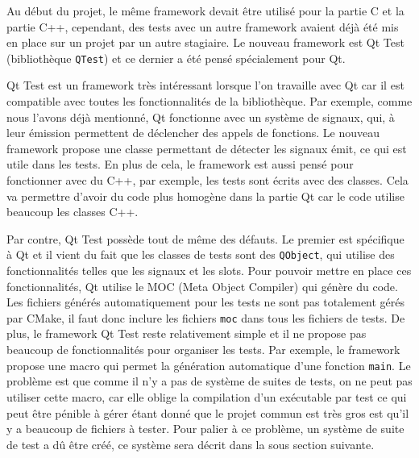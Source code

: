 \documentclass[a4paper]{article}
\begin{document}
Au début du projet, le même framework devait être utilisé pour la partie C et la
partie C++, cependant, des tests avec un autre framework avaient déjà été mis en
place sur un projet par un autre stagiaire. Le nouveau framework est Qt Test
(bibliothèque \verb|QTest|) et ce dernier a été pensé spécialement pour Qt.

Qt Test est un framework très intéressant lorsque l'on travaille avec Qt car il
est compatible avec toutes les fonctionnalités de la bibliothèque. Par exemple,
comme nous l'avons déjà mentionné, Qt fonctionne avec un système de signaux,
qui, à leur émission permettent de déclencher des appels de fonctions. Le
nouveau framework propose une classe permettant de détecter les signaux émit, ce
qui est utile dans les tests. En plus de cela, le framework est aussi pensé
pour fonctionner avec du C++, par exemple, les tests sont écrits avec des
classes. Cela va permettre d'avoir du code plus homogène dans la partie Qt car
le code utilise beaucoup les classes C++.

Par contre, Qt Test possède tout de même des défauts. Le premier est spécifique
à Qt et il vient du fait que les classes de tests sont des \verb|QObject|, qui
utilise des fonctionnalités telles que les signaux et les \gls{slots}. Pour
pouvoir mettre en place ces fonctionnalités, Qt utilise le MOC (Meta Object
Compiler) qui génère du code. Les fichiers générés automatiquement pour les
tests ne sont pas totalement gérés par CMake, il faut donc inclure les fichiers
\verb|moc| dans tous les fichiers de tests. De plus, le framework Qt Test reste
relativement simple et il ne propose pas beaucoup de fonctionnalités pour
organiser les tests. Par exemple, le framework propose une macro qui permet la
génération automatique d'une fonction \verb|main|. Le problème est que comme il
n'y a pas de système de suites de tests, on ne peut pas utiliser cette macro,
car elle oblige la compilation d'un exécutable par test ce qui peut être pénible
à gérer étant donné que le projet commun est très gros est qu'il y a beaucoup de
fichiers à tester. Pour palier à ce problème, un système de suite de test a dû
être créé, ce système sera décrit dans la sous section suivante.
\end{document}
